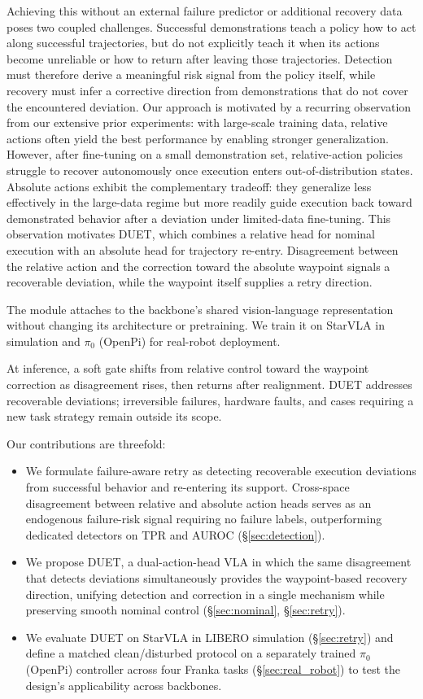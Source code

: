 \documentclass[letterpaper, 10 pt, conference]{ieeeconf}
\begin{document}
Achieving this without an external failure predictor or additional recovery data poses two coupled challenges. Successful demonstrations teach a policy how to act along successful trajectories, but do not explicitly teach it when its actions become unreliable or how to return after leaving those trajectories. Detection must therefore derive a meaningful risk signal from the policy itself, while recovery must infer a corrective direction from demonstrations that do not cover the encountered deviation. Our approach is motivated by a recurring observation from our extensive prior experiments: with large-scale training data, relative actions often yield the best performance by enabling stronger generalization. However, after fine-tuning on a small demonstration set, relative-action policies struggle to recover autonomously once execution enters out-of-distribution states. Absolute actions exhibit the complementary tradeoff: they generalize less effectively in the large-data regime but more readily guide execution back toward demonstrated behavior after a deviation under limited-data fine-tuning. This observation motivates DUET, which combines a relative head for nominal execution with an absolute head for trajectory re-entry. Disagreement between the relative action and the correction toward the absolute waypoint signals a recoverable deviation, while the waypoint itself supplies a retry direction.

The module attaches to the backbone's shared vision-language representation without changing its architecture or pretraining. We train it on StarVLA \cite{starvla} in simulation and $\pi_0$ (OpenPi) \cite{pi0} for real-robot deployment.

At inference, a soft gate shifts from relative control toward the waypoint correction as disagreement rises, then returns after realignment. DUET addresses recoverable deviations; irreversible failures, hardware faults, and cases requiring a new task strategy remain outside its scope.

Our contributions are threefold:
\begin{itemize}
    \item We formulate failure-aware retry as detecting recoverable execution deviations from successful behavior and re-entering its support. Cross-space disagreement between relative and absolute action heads serves as an endogenous failure-risk signal requiring no failure labels, outperforming dedicated detectors on TPR and AUROC (\S\ref{sec:detection}).
    \item We propose DUET, a dual-action-head VLA in which the same disagreement that detects deviations simultaneously provides the waypoint-based recovery direction, unifying detection and correction in a single mechanism while preserving smooth nominal control (\S\ref{sec:nominal}, \S\ref{sec:retry}).
    \item We evaluate DUET on StarVLA in LIBERO simulation (\S\ref{sec:retry}) and define a matched clean/disturbed protocol on a separately trained $\pi_0$ (OpenPi) controller across four Franka tasks (\S\ref{sec:real_robot}) to test the design's applicability across backbones.
\end{itemize}
\end{document}
